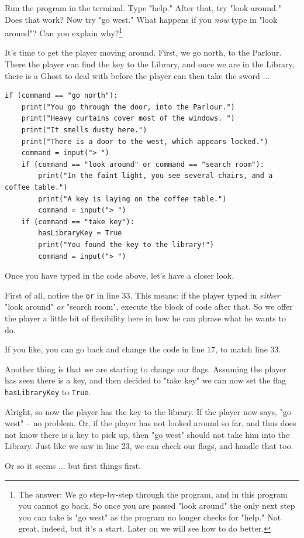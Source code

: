 \begin{Exe}
Run the program in the terminal. Type "help." After that, try "look around." Does that work? Now try "go west." What happens if you \emph{now} type in "look around"? Can you explain why?\footnote{The answer: We go step-by-step through the program, and in this program you cannot go back. So once you are passed "look around" the only next step you can take is "go west" as the program no longer checks for "help." Not great, indeed, but it's a start. Later on we will see how to do better.} \expend
\end{Exe}

It's time to get the player moving around. First, we go north, to the Parlour. There the player can find the key to the Library, and once we are in the Library, there is a Ghost to deal with before the player can then take the sword ... 

\begin{lstlisting}[firstnumber=last]
if (command == "go north"):
    print("You go through the door, into the Parlour.")
    print("Heavy curtains cover most of the windows. ")
    print("It smells dusty here.")
    print("There is a door to the west, which appears locked.")
    command = input("> ")
    if (command == "look around" or command == "search room"):
        print("In the faint light, you see several chairs, and a coffee table.")
        print("A key is laying on the coffee table.")
        command = input("> ")
    if (command == "take key"):
        hasLibraryKey = True
        print("You found the key to the library!")
        command = input("> ")
\end{lstlisting}
 
Once you have typed in the code above, let's have a closer look. 

First of all, notice the \texttt{or} in line 33. This means: if the player typed in \emph{either} "look around" \emph{or} "search room", execute the block of code after that. So we offer the player a little bit of flexibility here in how he can phrase what he wants to do. 

\begin{Exe}
If you like, you can go back and change the code in line 17, to match line 33. \expend 
\end{Exe}

Another thing is that we are starting to change our flags. Assuming the player has seen there is a key, and then decided to "take key" we can now set the flag \texttt{hasLibraryKey} to \texttt{True}. 

Alright, so now the player has the key to the library. If the player now says, "go west" -- no problem. Or, if the player has not looked around so far, and thus does not know there is a key to pick up, then "go west" should not take him into the Library. Just like we saw in line 23, we can check our flags, and handle that too. 

Or so it seems ... but first things first. 










  